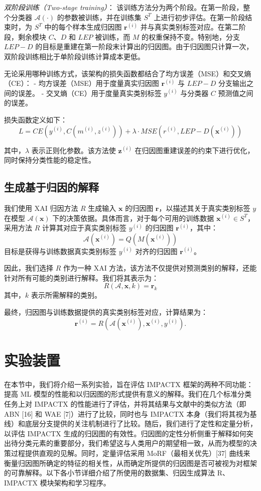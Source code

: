 \documentclass[12pt, a4paper]{ctexart} %
\begin{document}
\textit{双阶段训练（Two-stage training）}：
该训练方法分为两个阶段。在第一阶段，整个分类器 \( \mathcal{A}(\cdot) \) 的参数被训练，并在训练集 \( S^T \) 上进行初步评估。在第一阶段结束时，为 \( S^T \) 中的每个样本生成归因图 \( \mathbf{r}^{(i)} \) 并与真实类别标签对应。在第二阶段，剩余模块 \( C \)、\( D \) 和 \( LEP \) 被训练，而 \( M \) 的权重保持不变。特别地，分支 \( LEP-D \) 的目标是重建在第一阶段末计算出的归因图。由于归因图只计算一次，双阶段训练相比于单阶段训练计算成本更低。

无论采用哪种训练方式，该架构的损失函数都结合了均方误差（MSE）和交叉熵（CE）：
- 均方误差（MSE）用于度量真实归因图 \( \mathbf{r}^{(i)} \) 与 \( LEP-D \) 分支输出之间的误差。
- 交叉熵（CE）用于度量真实类别标签 \( y^{(i)} \) 与分类器 \( C \) 预测值之间的误差。

损失函数定义如下：
\[
L = CE\left(y^{(i)}, C(m^{(i)}, z^{(i)})\right) + \lambda \cdot MSE\left(r^{(i)}, LEP - D(\mathbf{x}^{(i)})\right)
\]

其中，\( \lambda \) 表示正则化参数。该方法使 \( \mathbf{z}^{(i)} \) 在归因图重建误差的约束下进行优化，同时保持分类性能的稳定性。

\subsection{生成基于归因的解释}
我们使用 XAI 归因方法 \( R \) 生成输入 \( \mathbf{x} \) 的归因图 \( \mathbf{r} \)，以描述其关于真实类别标签 \( y \) 在模型 \( \mathcal{A}(\mathbf{x}) \) 下的决策依据。具体而言，对于每个可用的训练数据 \( \mathbf{x}^{(i)} \in S^T \)，采用方法 \( R \) 计算其对应于真实类别标签 \( y^{(i)} \) 的归因图 \( \mathbf{r}^{(i)} \)，其中：
\[
\mathcal{A}(\mathbf{x}^{(i)}) = Q(M(\mathbf{x}^{(i)}))
\]
目标是获得与训练数据真实类别标签 \( y^{(i)} \) 对齐的归因图 \( \mathbf{r}^{(i)} \)。

因此，我们选择 \( R \) 作为一种 XAI 方法，该方法不仅提供对预测类别的解释，还能针对所有可能的类别进行解释。我们将其表示为：
\[
R(\mathcal{A}, \mathbf{x}, k) = \mathbf{r}_k
\]
其中，\( k \) 表示所需解释的类别。

最终，归因图与训练数据提供的真实类别标签对应，计算结果为：
\[
\mathbf{r}^{(i)} = R(\mathcal{A}(\mathbf{x}^{(i)}), \mathbf{x}^{(i)}, y^{(i)}).
\]
\section{实验装置}
在本节中，我们将介绍一系列实验，旨在评估 IMPACTX 框架的两种不同功能：提高 ML 模型的性能和以归因图的形式提供有意义的解释。我们在几个标准分类任务上对 IMPACTX 的性能进行了评估，并将其结果与文献中的类似方法（即 ABN [16] 和 WAE [7]）进行了比较，同时也与 IMPACTX 本身（我们将其视为基线）和底层分支提供的关注机制进行了比较。随后，我们进行了定性和定量分析，以评估 IMPACTX 生成的归因图的有效性。归因图的定性分析侧重于解释如何突出待分类元素的重要部分，我们希望这与人类用户的期望相一致，从而为模型的决策过程提供直观的见解。同时，定量评估采用 MoRF（最相关优先）[37] 曲线来衡量归因图所确定的特征的相关性，从而确定所提供的归因图是否可被视为对框架的可靠解释。以下各小节详细介绍了所使用的数据集、归因生成算法 R、IMPACTX 模块架构和学习程序。
\end{document}
